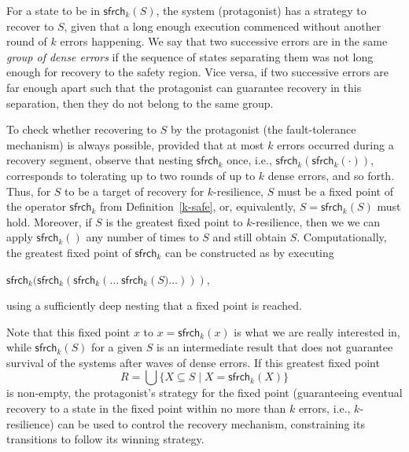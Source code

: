 \documentclass[times,10pt,twocolumn]{article}
\newcommand\safe{\mathsf{sfrch}}
\begin{document}
For a state to be in $\safe_k(S)$, 
the system (protagonist) has a strategy to recover to $S$, 
given that a long enough execution commenced 
without another round of $k$ errors happening.
We say that two successive errors are in the same 
\emph{group of dense errors} 
if the sequence of states separating them 
was not long enough for recovery to the safety region.
Vice versa, if two successive errors are far enough apart 
such that the protagonist can guarantee recovery in this separation, 
then they do not belong to the same group.
% 

To check whether recovering to $S$ by the protagonist (the fault-tolerance mechanism)
is always possible, provided that at most $k$ errors occurred during 
a recovery segment, observe that nesting 
$\safe_k$ once, i.e., $\safe_k(\safe_k(\cdot))$, corresponds
to tolerating up to two rounds of up to $k$ dense errors, and so forth.
Thus, for $S$ to be a target of recovery for $k$-resilience, 
$S$ must be a fixed point of the operator
$\safe_k$ from Definition~\ref{k-safe}, or, equivalently, 
$S=\safe_k(S)$ must hold.  
Moreover, if $S$ is the greatest fixed point to $k$-resilience, then we we can apply 
$\safe_k()$ any number of times to $S$ and still obtain $S$.  
Computationally, the greatest fixed point of $\safe_k$ can be constructed as 
by executing  
\begin{center} 
$\safe_k(\safe_k(\safe_k(\ldots\ \safe_k(S\big)\ldots)))$,
\end{center}  
using a sufficiently deep nesting that a fixed point is reached.

Note that this fixed point $x$ to $x=\safe_k(x)$ is what we are really interested in, 
while $\safe_k(S)$ for a given $S$ is an intermediate result that does not 
guarantee survival of the systems after waves of dense errors.
If this greatest fixed point
$$R = \bigcup\{X \subseteq S \mid X = \safe_k ( X )\}$$ is non-empty, 
the protagonist's strategy for 
the fixed point (guaranteeing eventual recovery 
to a state in the fixed point within no more than $k$ errors, i.e., $k$-resilience) 
can be used to control the recovery mechanism, 
constraining its transitions to follow its winning strategy.
\end{document}
